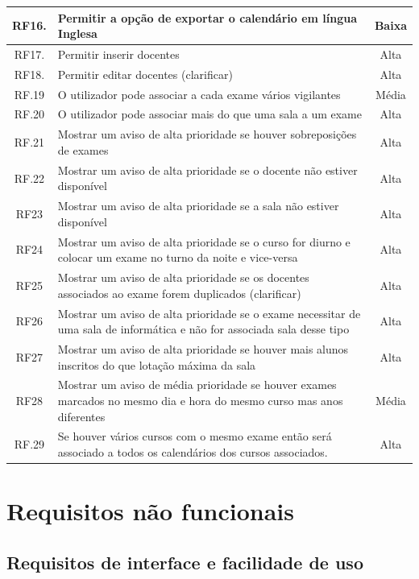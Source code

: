 \documentclass[11pt, twoside]{report}
\begin{document}
\begin{table}[H]
\begin{center}
\begin{tabularx}{\textwidth}{|c|X|c|}
			RF16. & Permitir a opção de exportar o calendário em língua Inglesa & Baixa \\
			\hline
			RF17. & Permitir inserir docentes & Alta\\
			\hline
			RF18. & Permitir editar docentes (clarificar) & Alta\\
			\hline
			RF.19 &O utilizador pode associar a cada exame vários vigilantes & Média\\
			\hline
			RF.20 &	O utilizador pode associar mais do que uma sala a um exame & Alta\\
			\hline
			RF.21 &Mostrar um aviso de alta prioridade se houver sobreposições de exames & Alta\\
			\hline
			RF.22 & Mostrar um aviso de alta prioridade se o docente não estiver disponível & Alta \\
			\hline
			RF23 & Mostrar um aviso de alta prioridade se a sala não estiver disponível & Alta\\
			\hline
			RF24 & Mostrar um aviso de alta prioridade se o curso for diurno e colocar um exame no turno da noite e vice-versa & Alta\\
			\hline
			RF25&Mostrar um aviso de alta prioridade se os docentes associados ao exame forem duplicados (clarificar) & Alta \\
			\hline
			RF26 & Mostrar um aviso de alta prioridade se o exame necessitar de uma sala de informática e não for associada sala desse tipo & Alta\\
			\hline
			RF27 & Mostrar um aviso de alta prioridade se houver mais alunos inscritos do que  lotação máxima da sala & Alta\\
			\hline
			RF28 & Mostrar um aviso de média prioridade se houver exames marcados no mesmo dia e hora do mesmo curso mas anos diferentes & Média\\
			\hline
			RF.29 & Se houver vários cursos com o mesmo exame então será associado a todos os calendários dos cursos associados. & Alta\\
			\hline
		\end{tabularx}
	\end{center}
\end{table}



	
	\section{Requisitos não funcionais}
	\subsection{Requisitos de interface e facilidade de uso}
\end{document}

